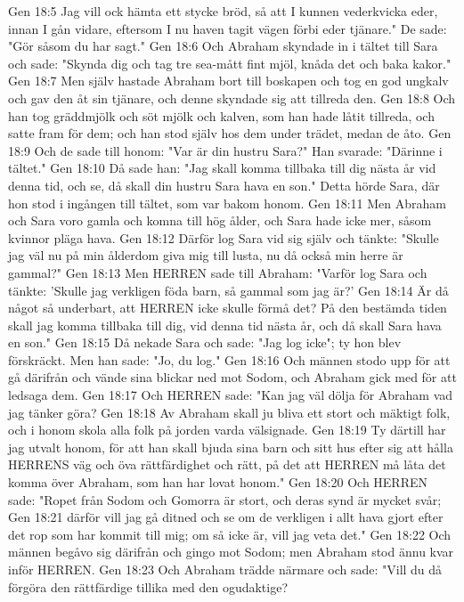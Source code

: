 Gen 18:5  Jag vill ock hämta ett stycke bröd, så att I kunnen vederkvicka eder, innan I gån vidare, eftersom I nu haven tagit vägen förbi eder tjänare." De sade: "Gör såsom du har sagt."
Gen 18:6  Och Abraham skyndade in i tältet till Sara och sade: "Skynda dig och tag tre sea-mått fint mjöl, knåda det och baka kakor."
Gen 18:7  Men själv hastade Abraham bort till boskapen och tog en god ungkalv och gav den åt sin tjänare, och denne skyndade sig att tillreda den.
Gen 18:8  Och han tog gräddmjölk och söt mjölk och kalven, som han hade låtit tillreda, och satte fram för dem; och han stod själv hos dem under trädet, medan de åto.
Gen 18:9  Och de sade till honom: "Var är din hustru Sara?" Han svarade: "Därinne i tältet."
Gen 18:10  Då sade han: "Jag skall komma tillbaka till dig nästa år vid denna tid, och se, då skall din hustru Sara hava en son." Detta hörde Sara, där hon stod i ingången till tältet, som var bakom honom.
Gen 18:11  Men Abraham och Sara voro gamla och komna till hög ålder, och Sara hade icke mer, såsom kvinnor pläga hava.
Gen 18:12  Därför log Sara vid sig själv och tänkte: "Skulle jag väl nu på min ålderdom giva mig till lusta, nu då också min herre är gammal?"
Gen 18:13  Men HERREN sade till Abraham: "Varför log Sara och tänkte: 'Skulle jag verkligen föda barn, så gammal som jag är?'
Gen 18:14  Är då något så underbart, att HERREN icke skulle förmå det? På den bestämda tiden skall jag komma tillbaka till dig, vid denna tid nästa år, och då skall Sara hava en son."
Gen 18:15  Då nekade Sara och sade: "Jag log icke"; ty hon blev förskräckt. Men han sade: "Jo, du log."
Gen 18:16  Och männen stodo upp för att gå därifrån och vände sina blickar ned mot Sodom, och Abraham gick med för att ledsaga dem.
Gen 18:17  Och HERREN sade: "Kan jag väl dölja för Abraham vad jag tänker göra?
Gen 18:18  Av Abraham skall ju bliva ett stort och mäktigt folk, och i honom skola alla folk på jorden varda välsignade.
Gen 18:19  Ty därtill har jag utvalt honom, för att han skall bjuda sina barn och sitt hus efter sig att hålla HERRENS väg och öva rättfärdighet och rätt, på det att HERREN må låta det komma över Abraham, som han har lovat honom."
Gen 18:20  Och HERREN sade: "Ropet från Sodom och Gomorra är stort, och deras synd är mycket svår;
Gen 18:21  därför vill jag gå ditned och se om de verkligen i allt hava gjort efter det rop som har kommit till mig; om så icke är, vill jag veta det."
Gen 18:22  Och männen begåvo sig därifrån och gingo mot Sodom; men Abraham stod ännu kvar inför HERREN.
Gen 18:23  Och Abraham trädde närmare och sade: "Vill du då förgöra den rättfärdige tillika med den ogudaktige?
